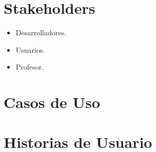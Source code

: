     \section{Stakeholders}
    \begin{itemize}
        \item Desarrolladores.
        \item Usuarios.
        \item Profesor.
    \end{itemize}

	\section{Casos de Uso}
	 
    
    \section{Historias de Usuario}
    


    
    
    
